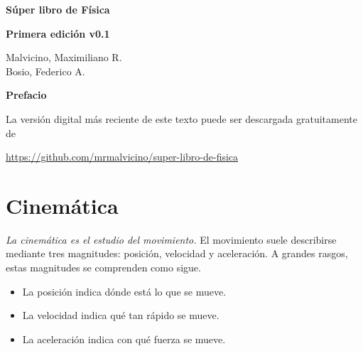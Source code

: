 \documentclass[a5paper,12pt,twoside]{book}
\begin{document}
\pagestyle{fancy}
\fancyhf{}
\chead{\scriptsize \nouppercase\rightmark}
\cfoot{\scriptsize \thepage}
\renewcommand{\headrulewidth}{0pt}

\frontmatter


\begin{center}

    \begin{Huge}
    \textbf{Súper libro de Física}
    \end{Huge}

    \vspace{1cm}
    \textbf{Primera edición v0.1}
    \vspace{2cm}

    \begin{Large}
        Malvicino, Maximiliano R. \\
        Bosio, Federico A.
    \end{Large}

\end{center}

\clearpage
\noindent
\textbf{Prefacio}

La versión digital más reciente de este texto puede ser descargada gratuitamente de
\begin{center}
    \url{https://github.com/mrmalvicino/super-libro-de-fisica}
\end{center}

\renewcommand{\spanishappendixname}{Anexo}
\tableofcontents

\mainmatter
{}


\chapter{Cinemática}

\emph{La cinemática es el estudio del movimiento.}
El movimiento suele describirse mediante tres magnitudes: posición, velocidad y aceleración.
A grandes rasgos, estas magnitudes se comprenden como sigue.
\begin{itemize}
    \item La posición indica dónde está lo que se mueve.
    \item La velocidad indica qué tan rápido se mueve.
    \item La aceleración indica con qué fuerza se mueve.
\end{itemize}
\end{document}
